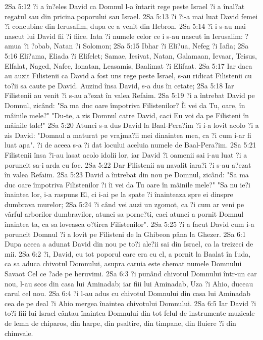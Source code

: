 2Sa 5:12  ?i a în?eles David ca Domnul l-a întarit rege peste Israel ?i a înal?at regatul sau din pricina poporului sau Israel.
2Sa 5:13  ?i ?i-a mai luat David femei ?i concubine din Ierusalim, dupa ce a venit din Hebron.
2Sa 5:14  ?i i s-au mai nascut lui David fii ?i fiice. Iata ?i numele celor ce i s-au nascut în Ierusalim: ?amua ?i ?obab, Natan ?i Solomon;
2Sa 5:15  Ibhar ?i Eli?ua, Nefeg ?i Iafia;
2Sa 5:16  Eli?ama, Eliada ?i Elifelet; Samae, Iesivat, Natan, Galamaan, Ievaar, Teisus, Elfalat, Naged, Nafec, Ionatan, Leasamis, Baalimat ?i Elifaat.
2Sa 5:17  Iar daca au auzit Filistenii ca David a fost uns rege peste Israel, s-au ridicat Filistenii cu to?ii sa caute pe David. Auzind însa David, s-a dus în cetate;
2Sa 5:18  Iar Filistenii au venit ?i s-au a?ezat în valea Refaim.
2Sa 5:19  ?i a întrebat David pe Domnul, zicând: "Sa ma duc oare împotriva Filistenilor? Îi vei da Tu, oare, în mâinile mele?" "Du-te, a zis Domnul catre David, caci Eu voi da pe Filisteni în mâinile tale!"
2Sa 5:20  Atunci s-a dus David la Baal-Pera?im ?i i-a lovit acolo ?i a zis David: "Domnul a maturat pe vrajma?ii mei dinaintea mea, ca ?i cum i-ar fi luat apa". ?i de aceea s-a ?i dat locului aceluia numele de Baal-Pera?im.
2Sa 5:21  Filistenii însa ?i-au lasat acolo idolii lor, iar David ?i oamenii sai i-au luat ?i a poruncit sa-i arda cu foc.
2Sa 5:22  Dar Filistenii au navalit iara?i ?i s-au a?ezat în valea Refaim.
2Sa 5:23  David a întrebat din nou pe Domnul, zicând: "Sa ma duc oare împotriva Filistenilor ?i îi vei da Tu oare în mâinile mele?" "Sa nu ie?i înaintea lor, i-a raspuns El, ci i-ai pe la spate ?i înainteaza spre ei dinspre dumbrava murelor;
2Sa 5:24  ?i când vei auzi un zgomot, ca ?i cum ar veni pe vârful arborilor dumbravilor, atunci sa porne?ti, caci atunci a pornit Domnul înaintea ta, ca sa loveasca o?tirea Filistenilor".
2Sa 5:25  ?i a facut David cum i-a poruncit Domnul ?i a lovit pe Filisteni de la Ghibeon pâna la Ghezer.
2Sa 6:1  Dupa aceea a adunat David din nou pe to?i ale?ii sai din Israel, ca la treizeci de mii.
2Sa 6:2  ?i, David, cu tot poporul care era cu el, a pornit la Baalat în Iuda, ca sa aduca chivotul Domnului, asupra caruia este chemat numele Domnului Savaot Cel ce ?ade pe heruvimi.
2Sa 6:3  ?i punând chivotul Domnului într-un car nou, l-au scos din casa lui Aminadab; iar fiii lui Aminadab, Uza ?i Ahio, duceau carul cel nou.
2Sa 6:4  ?i l-au adus cu chivotul Domnului din casa lui Aminadab cea de pe deal ?i Ahio mergea înaintea chivotului Domnului.
2Sa 6:5  Iar David ?i to?i fiii lui Israel cântau înaintea Domnului din tot felul de instrumente muzicale de lemn de chiparos, din harpe, din psaltire, din timpane, din fluiere ?i din chimvale.
